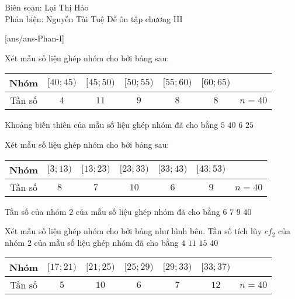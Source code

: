 ﻿\begin{name}
 {Biên soạn: Lại Thị Hảo \\ Phản biện: Nguyễn Tài Tuệ}
 {Đề ôn tập chương III}
\end{name}

\caulc
{}[ans/ans\currfilebase-Phan-I]

\begin{ex}%
Xét mẫu số liệu ghép nhóm cho bởi bảng sau:
\begin{center}
\begin{tabular}{|c|c|c|c|c|c|c|}
 \hline
 Nhóm & $[40; 45)$ & $[45; 50)$ & $[50; 55)$ & $[55; 60)$ & $[60; 65)$ & \\
 \hline
 Tần số & $4$ & $11$ & $9$ & $8$ & $8$ & $n=40$ \\
 \hline
\end{tabular}
\end{center}
Khoảng biến thiên của mẫu số liệu ghép nhóm đã cho bằng
\choice
{$5$}
{$40$}
{$6$}
{\True $25$}
\end{ex}

\begin{ex}%
 Xét mẫu số liệu ghép nhóm cho bởi bảng sau:
\begin{center}
\begin{tabular}{|c|c|c|c|c|c|c|}
 \hline
 Nhóm & $[3; 13)$ & $[13; 23)$ & $[23; 33)$ & $[33; 43)$ & $[43; 53)$ & \\
 \hline
 Tần số & $8$ & $7$ & $10$ & $6$ & $9$ & $n=40$ \\
 \hline
\end{tabular}
\end{center}
 Tần số của nhóm $2$ của mẫu số liệu ghép nhóm đã cho bằng
 \choice
 {$6$}
 {\True $7$}
 {$9$}
 {$40$}
\end{ex}

\begin{ex}%
Xét mẫu số liệu ghép nhóm cho bởi bảng như hình bên.
 Tần số tích lũy $c f_2$ của nhóm $2$ của mẫu số liệu ghép nhóm đã cho bằng
 \choice
 {$4$}
 {$11$}
 {\True $15$}
 {$40$}
 \begin{center}
 \begin{tabular}{|c|c|c|c|c|c|c|}
 \hline
 Nhóm & $[17; 21)$ & $[21; 25)$ & $[25; 29)$ & $[29; 33)$ & $[33; 37)$ & \\
 \hline
 Tần số & $5$ & $10$ & $6$ & $7$ & $12$ & $n=40$ \\
 \hline
 \end{tabular}
 \end{center}
\end{ex}

